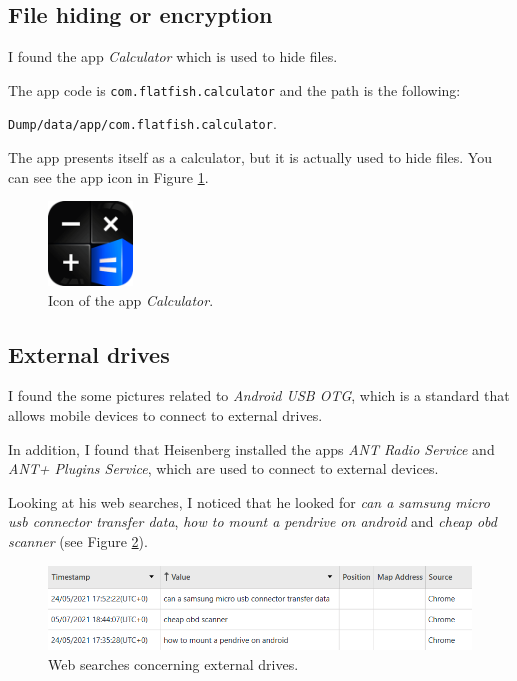 \documentclass[12pt]{article}
\begin{document}
\subsection{File hiding or encryption}
\label{sec:file-hiding}

I found the app \textit{Calculator} \cite{calculator} which is used to hide files.

The app code is \texttt{com.flatfish.calculator} and the path is the following:

\texttt{Dump/data/app/com.flatfish.calculator}. 

The app presents itself as a calculator, but it is actually used to hide files. You can see the app icon in Figure \ref{fig:calc}.

\begin{figure}[!ht]
    \centering
    \includegraphics[width=0.2\textwidth]{images/icon.png}
    \caption{Icon of the app \textit{Calculator}.}
    \label{fig:calc}
\end{figure}

\subsection{External drives}

I found the some pictures related to \textit{Android USB OTG}, which is a standard that allows mobile devices to connect to external drives.

In addition, I found that Heisenberg installed the apps \textit{ANT Radio Service} and \textit{ANT+ Plugins Service}, which are used to connect to external devices.

Looking at his web searches, I noticed that he looked for \textit{can a samsung micro usb connector transfer data}, \textit{how to mount a pendrive on android} and \textit{cheap obd scanner} (see Figure \ref{fig:web}).

\begin{figure}[!ht]
    \centering
    \includegraphics[width=\textwidth]{images/web-searches.png}
    \caption{Web searches concerning external drives.}
    \label{fig:web}
\end{figure}
\end{document}
